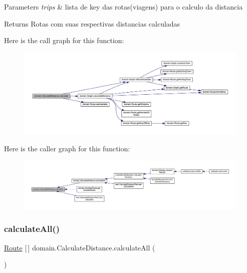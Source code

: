 \begin{DoxyParams}{Parameters}
{\em trips} & lista de key das rotas(viagens) para o calculo da distancia \\
\hline
\end{DoxyParams}
\begin{DoxyReturn}{Returns}
Rotas com suas respectivas distancias calculadas 
\end{DoxyReturn}
Here is the call graph for this function\+:\nopagebreak
\begin{figure}[H]
\begin{center}
\leavevmode
\includegraphics[width=350pt]{classdomain_1_1_calculate_distance_ad08ace3a0aa30e9ec6c99e8826630ad3_cgraph}
\end{center}
\end{figure}
Here is the caller graph for this function\+:\nopagebreak
\begin{figure}[H]
\begin{center}
\leavevmode
\includegraphics[width=350pt]{classdomain_1_1_calculate_distance_ad08ace3a0aa30e9ec6c99e8826630ad3_icgraph}
\end{center}
\end{figure}
\mbox{\label{classdomain_1_1_calculate_distance_a188113ff0f6a119f4addd523b5e06a9c}} 
\subsubsection{\texorpdfstring{calculate\+All()}{calculateAll()}}
{\footnotesize\ttfamily \hyperlink{classdomain_1_1_route}{Route} \mbox{[}$\,$\mbox{]} domain.\+Calculate\+Distance.\+calculate\+All (\begin{DoxyParamCaption}{ }\end{DoxyParamCaption})}

